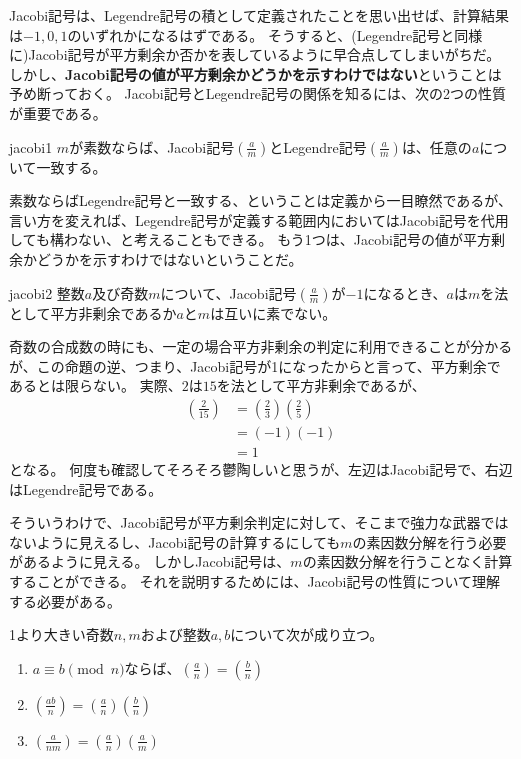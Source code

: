 Jacobi記号は、Legendre記号の積として定義されたことを思い出せば、計算結果は$-1,0,1$のいずれかになるはずである。
そうすると、(Legendre記号と同様に)Jacobi記号が平方剰余か否かを表しているように早合点してしまいがちだ。
しかし、\textbf{Jacobi記号の値が平方剰余かどうかを示すわけではない}ということは予め断っておく。
Jacobi記号とLegendre記号の関係を知るには、次の2つの性質が重要である。

\begin{Prop}{}{jacobi1}
$m$が素数ならば、Jacobi記号$\left(\frac{a}{m}\right)$とLegendre記号$\left(\frac{a}{m}\right)$は、任意の$a$について一致する。
\end{Prop}

素数ならばLegendre記号と一致する、ということは定義から一目瞭然であるが、言い方を変えれば、Legendre記号が定義する範囲内においてはJacobi記号を代用しても構わない、と考えることもできる。
もう1つは、Jacobi記号の値が平方剰余かどうかを示すわけではないということだ。

\begin{Prop}{}{jacobi2}
整数$a$及び奇数$m$について、Jacobi記号$\left(\frac{a}{m}\right)$が$-1$になるとき、$a$は$m$を法として平方非剰余であるか$a$と$m$は互いに素でない。
\end{Prop}

奇数の合成数の時にも、一定の場合平方非剰余の判定に利用できることが分かるが、この命題の逆、つまり、Jacobi記号が1になったからと言って、平方剰余であるとは限らない。
実際、$2$は$15$を法として平方非剰余であるが、
\begin{align*}
\left(\frac{2}{15}\right) &= \left(\frac{2}{3}\right)\left(\frac{2}{5}\right)\\
&= (-1)(-1)\\
&= 1
\end{align*}
となる。
何度も確認してそろそろ鬱陶しいと思うが、左辺はJacobi記号で、右辺はLegendre記号である。

そういうわけで、Jacobi記号が平方剰余判定に対して、そこまで強力な武器ではないように見えるし、Jacobi記号の計算するにしても$m$の素因数分解を行う必要があるように見える。
しかしJacobi記号は、$m$の素因数分解を行うことなく計算することができる。
それを説明するためには、Jacobi記号の性質について理解する必要がある。

\begin{Prop}{}{}
1より大きい奇数$n,m$および整数$a,b$について次が成り立つ。
\begin{enumerate}
\item $a\equiv b \pmod{n}$ならば、$\left(\frac{a}{n}\right)=\left(\frac{b}{n}\right)$
\item $\left(\frac{ab}{n}\right)=\left(\frac{a}{n}\right)\left(\frac{b}{n}\right)$
\item $\left(\frac{a}{nm}\right)=\left(\frac{a}{n}\right)\left(\frac{a}{m}\right)$
\end{enumerate}
\end{Prop}

